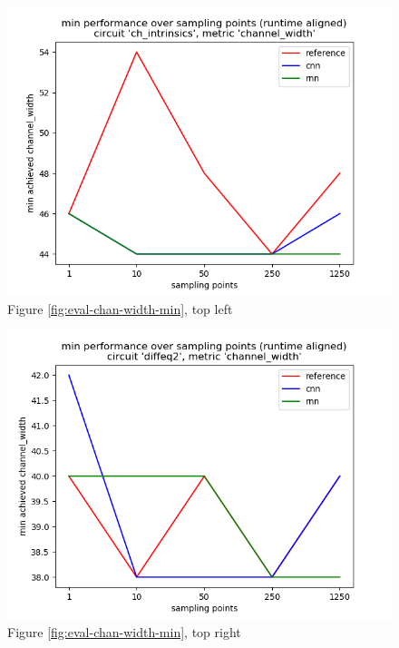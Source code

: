 \begin{figure}[H]
	\includegraphics[width=\linewidth]{plots/eval-ch_intrinsics-chan-width-min-full.png}
	\caption{Figure \ref{fig:eval-chan-width-min}, top left}
\end{figure}

\begin{figure}[H]
\includegraphics[width=\linewidth]{plots/eval-diffeq2-chan-width-min-full.png}
\caption{Figure \ref{fig:eval-chan-width-min}, top right}
\end{figure}


